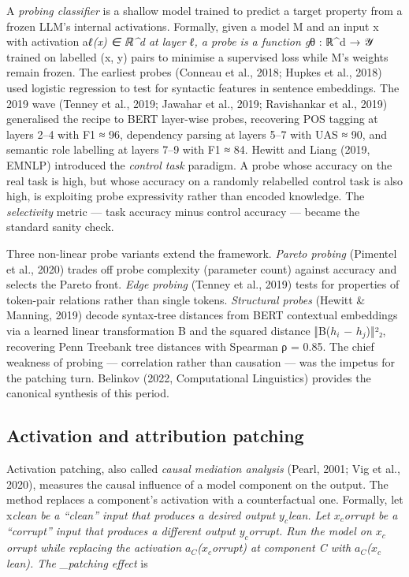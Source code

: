 A \emph{probing classifier} is a shallow model trained to predict a target property from a frozen LLM's internal activations. Formally, given a model M and an input x with activation a\emph{ℓ(x) ∈ ℝ\^{}d at layer ℓ, a probe is a function g}θ : ℝ\^{}d → 𝒴 trained on labelled (x, y) pairs to minimise a supervised loss while M's weights remain frozen. The earliest probes (Conneau et al., 2018; Hupkes et al., 2018) used logistic regression to test for syntactic features in sentence embeddings. The 2019 wave (Tenney et al., 2019; Jawahar et al., 2019; Ravishankar et al., 2019) generalised the recipe to BERT layer-wise probes, recovering POS tagging at layers 2--4 with F1 ≈ 96, dependency parsing at layers 5--7 with UAS ≈ 90, and semantic role labelling at layers 7--9 with F1 ≈ 84. Hewitt and Liang (2019, EMNLP) introduced the \emph{control task} paradigm. A probe whose accuracy on the real task is high, but whose accuracy on a randomly relabelled control task is also high, is exploiting probe expressivity rather than encoded knowledge. The \emph{selectivity} metric --- task accuracy minus control accuracy --- became the standard sanity check.

Three non-linear probe variants extend the framework. \emph{Pareto probing} (Pimentel et al., 2020) trades off probe complexity (parameter count) against accuracy and selects the Pareto front. \emph{Edge probing} (Tenney et al., 2019) tests for properties of token-pair relations rather than single tokens. \emph{Structural probes} (Hewitt \& Manning, 2019) decode syntax-tree distances from BERT contextual embeddings via a learned linear transformation B and the squared distance ‖B(\(h_i\) − \(h_j\))‖²₂, recovering Penn Treebank tree distances with Spearman ρ = 0.85. The chief weakness of probing --- correlation rather than causation --- was the impetus for the patching turn. Belinkov (2022, Computational Linguistics) provides the canonical synthesis of this period.

\subsection{Activation and attribution patching}\label{activation-and-attribution-patching}

Activation patching, also called \emph{causal mediation analysis} (Pearl, 2001; Vig et al., 2020), measures the causal influence of a model component on the output. The method replaces a component's activation with a counterfactual one. Formally, let x\emph{clean be a ``clean'' input that produces a desired output \(y_c\)lean. Let \(x_c\)orrupt be a ``corrupt'' input that produces a different output \(y_c\)orrupt. Run the model on \(x_c\)orrupt while replacing the activation \(a_C\)(\(x_c\)orrupt) at component C with \(a_C\)(\(x_c\)lean). The \_patching effect} is

